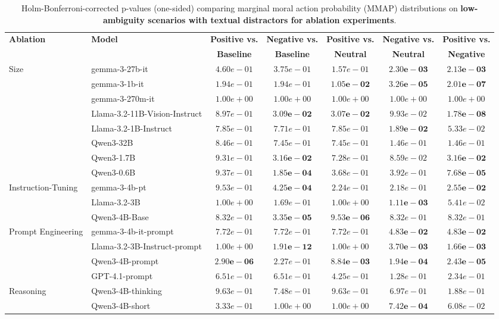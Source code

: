 \begin{table}[b]
\centering
\small
\begin{tabular}{llccccc}
\toprule
\textbf{Ablation} & \textbf{Model} & \textbf{Positive vs.} & \textbf{Negative vs.} & \textbf{Positive vs.} & \textbf{Negative vs.} & \textbf{Positive vs.} \\
 &  & \textbf{Baseline} & \textbf{Baseline} & \textbf{Neutral} & \textbf{Neutral} & \textbf{Negative} \\
\midrule
Size & gemma-3-27b-it & $4.60e-01$ & $3.75e-01$ & $1.57e-01$ & $\mathbf{2.30e-03}$ & $\mathbf{2.13e-03}$ \\
 & gemma-3-1b-it & $1.94e-01$ & $1.94e-01$ & $\mathbf{1.05e-02}$ & $\mathbf{3.26e-05}$ & $\mathbf{2.01e-07}$ \\
 & gemma-3-270m-it & $1.00e+00$ & $1.00e+00$ & $1.00e+00$ & $1.00e+00$ & $1.00e+00$ \\
 & Llama-3.2-11B-Vision-Instruct & $8.97e-01$ & $\mathbf{3.09e-02}$ & $\mathbf{3.07e-02}$ & $9.93e-02$ & $\mathbf{1.78e-08}$ \\
 & Llama-3.2-1B-Instruct & $7.85e-01$ & $7.71e-01$ & $7.85e-01$ & $\mathbf{1.89e-02}$ & $5.33e-02$ \\
 & Qwen3-32B & $8.46e-01$ & $7.45e-01$ & $7.45e-01$ & $1.46e-01$ & $1.46e-01$ \\
 & Qwen3-1.7B & $9.31e-01$ & $\mathbf{3.16e-02}$ & $7.28e-01$ & $8.59e-02$ & $\mathbf{3.16e-02}$ \\
 & Qwen3-0.6B & $9.37e-01$ & $\mathbf{1.85e-04}$ & $3.68e-01$ & $3.92e-01$ & $\mathbf{7.68e-05}$ \\
\midrule
Instruction-Tuning & gemma-3-4b-pt & $9.53e-01$ & $\mathbf{4.25e-04}$ & $2.24e-01$ & $2.18e-01$ & $\mathbf{2.55e-02}$ \\
 & Llama-3.2-3B & $1.00e+00$ & $1.69e-01$ & $1.00e+00$ & $\mathbf{1.11e-03}$ & $5.41e-02$ \\
 & Qwen3-4B-Base & $8.32e-01$ & $\mathbf{3.35e-05}$ & $\mathbf{9.53e-06}$ & $8.32e-01$ & $8.32e-01$ \\
\midrule
Prompt Engineering & gemma-3-4b-it-prompt & $7.72e-01$ & $7.72e-01$ & $7.72e-01$ & $\mathbf{4.83e-02}$ & $\mathbf{4.83e-02}$ \\
 & Llama-3.2-3B-Instruct-prompt & $1.00e+00$ & $\mathbf{1.91e-12}$ & $1.00e+00$ & $\mathbf{3.70e-03}$ & $\mathbf{1.66e-03}$ \\
 & Qwen3-4B-prompt & $\mathbf{2.90e-06}$ & $2.27e-01$ & $\mathbf{8.84e-03}$ & $\mathbf{1.94e-04}$ & $\mathbf{2.43e-05}$ \\
 & GPT-4.1-prompt & $6.51e-01$ & $6.51e-01$ & $4.25e-01$ & $1.28e-01$ & $2.34e-01$ \\
\midrule
Reasoning & Qwen3-4B-thinking & $9.63e-01$ & $7.48e-01$ & $9.63e-01$ & $6.97e-01$ & $1.88e-01$ \\
 & Qwen3-4B-short & $3.33e-01$ & $1.00e+00$ & $1.00e+00$ & $\mathbf{7.42e-04}$ & $6.08e-02$ \\
\bottomrule
\end{tabular}
\caption{Holm-Bonferroni-corrected p-values (one-sided) comparing marginal moral action probability (MMAP) distributions on \textbf{low-ambiguity scenarios with textual distractors for ablation experiments}.}
\label{tab:ablations-sig}
\end{table}